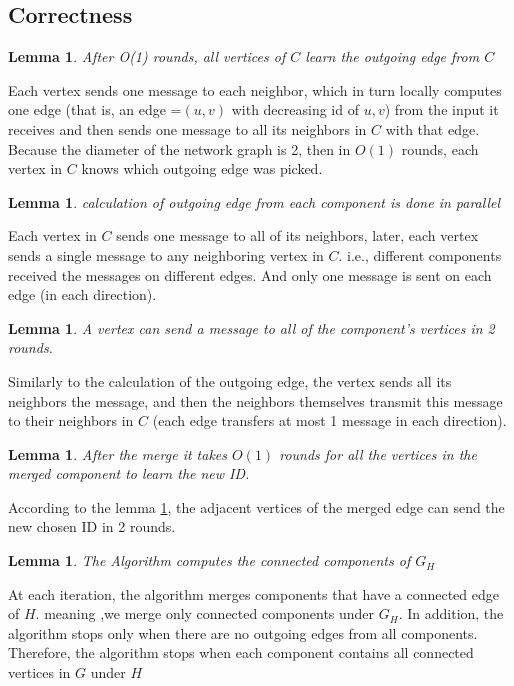 \documentclass[11pt]{article}
\newtheorem{lemma}[theorem]{Lemma}
\begin{document}
\subsection*{Correctness}
\begin{lemma}
After O(1) rounds, all vertices of $C$ learn the outgoing edge from $C$ 
\end{lemma}
Each vertex sends one message to each neighbor, which in turn locally computes one edge (that is, an edge =$(u,v)$ with decreasing id of $u,v$) from the input it receives and then sends one message to all its neighbors in $C$ with that edge.
Because the diameter of the network graph is 2, then in $O(1)$ rounds, each vertex in $C$ knows which outgoing edge was picked.

\begin{lemma}
calculation of outgoing edge from each component is done in parallel
\end{lemma}
Each vertex in $C$ sends one message to all of its neighbors, later, each vertex sends a single message to any neighboring vertex in $C$. i.e., different components received the messages on different edges. And only one message is sent on each edge (in each direction). 

\begin{lemma}
\label{message_transfer_2_rounds}
A vertex can send a message to all of the component's vertices in 2 rounds.
\end{lemma}
Similarly to the calculation of the outgoing edge, the vertex sends all its neighbors the message, and then the neighbors themselves transmit this message to their neighbors in $C$ (each edge transfers at most 1 message in each direction).

\begin{lemma}
After the merge it takes $O(1)$ rounds for all the vertices in the merged component to learn the new ID.
\end{lemma}
According to the lemma \ref{message_transfer_2_rounds}, the adjacent vertices of the merged edge can send the new chosen ID in 2 rounds.

\begin{lemma}
The Algorithm computes the connected components of $G_H$
\end{lemma}
At each iteration, the algorithm merges components that have a connected edge of $H$. meaning ,we merge only connected components under $G_H$. In addition, the algorithm stops only when there are no outgoing edges from all components. Therefore, the algorithm stops when each component contains all connected vertices in $G$ under $H$
\end{document}
